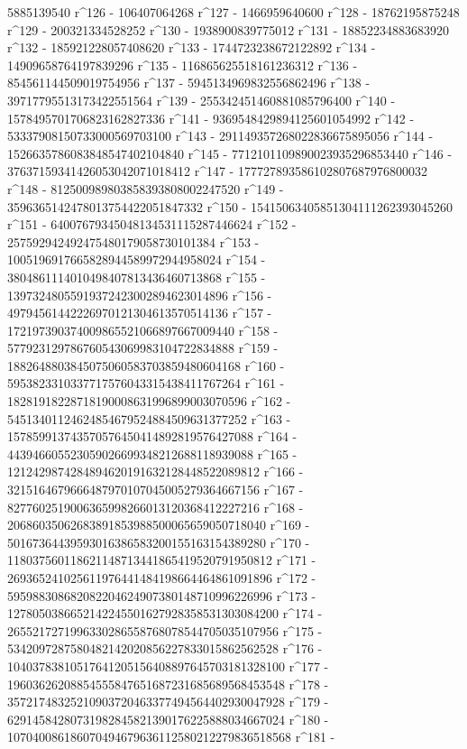        5885139540 r^126 - 106407064268 r^127 - 1466959640600 r^128 - 
       18762195875248 r^129 - 200321334528252 r^130 - 
       1938900839775012 r^131 - 18852234883683920 r^132 - 
       185921228057408620 r^133 - 1744723238672122892 r^134 - 
       14909658764197839296 r^135 - 116865625518161236312 r^136 - 
       854561144509019754956 r^137 - 5945134969832556862496 r^138 - 
       39717795513173422551564 r^139 - 
       255342451460881085796400 r^140 - 
       1578495701706823162827336 r^141 - 
       9369548429894125601054992 r^142 - 
       53337908150733000569703100 r^143 - 
       291149357268022836675895056 r^144 - 
       1526635786083848547402104840 r^145 - 
       7712101109890023935296853440 r^146 - 
       37637159341426053042071018412 r^147 - 
       177727893586102807687976800032 r^148 - 
       812500989803858393808002247520 r^149 - 
       3596365142478013754422051847332 r^150 - 
       15415063405851304111262393045260 r^151 - 
       64007679345048134531115287446624 r^152 - 
       257592942492475480179058730101384 r^153 - 
       1005196917665828944589972944958024 r^154 - 
       3804861114010498407813436460713868 r^155 - 
       13973248055919372423002894623014896 r^156 - 
       49794561442226970121304613570514136 r^157 - 
       172197390374009865521066897667009440 r^158 - 
       577923129786760543069983104722834888 r^159 - 
       1882648803845075060583703859480604168 r^160 - 
       5953823310337717576043315438411767264 r^161 - 
       18281918228718190008631996899003070596 r^162 - 
       54513401124624854679524884509631377252 r^163 - 
       157859913743570576450414892819576427088 r^164 - 
       443946605523059026699348212688118939088 r^165 - 
       1212429874284894620191632128448522089812 r^166 - 
       3215164679666487970107045005279364667156 r^167 - 
       8277602519006365998266013120368412227216 r^168 - 
       20686035062683891853988500065659050718040 r^169 - 
       50167364439593016386583200155163154389280 r^170 - 
       118037560118621148713441865419520791950812 r^171 - 
       269365241025611976441484198664464861091896 r^172 - 
       595988308682082204624907380148710996226996 r^173 - 
       1278050386652142245501627928358531303084200 r^174 - 
       2655217271996330286558768078544705035107956 r^175 - 
       5342097287580482142020856227833015862562528 r^176 - 
       10403783810517641205156408897645703181328100 r^177 - 
       19603626208854555847651687231685689568453548 r^178 - 
       35721748325210903720463377494564402930047928 r^179 - 
       62914584280731982845821390176225888034667024 r^180 - 
       107040086186070494679636112580212279836518568 r^181 - 
